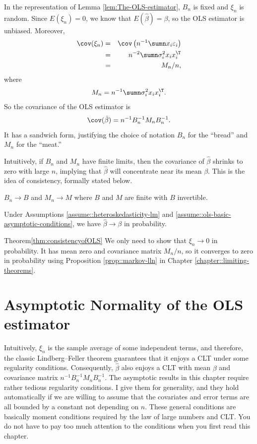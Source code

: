 In the representation of Lemma \ref{lem:The-OLS-estimator}, $B_n$ is fixed and $\xi_n$ is random. Since $E(\xi_n) = 0$, we know that $E(\hat{\beta})=\beta$, so the OLS estimator is unbiased. Moreover, 
\begin{eqnarray*}
\cov(\xi_n)  
&=&  \cov\left( n^{-1}\sumn x_{i}\varepsilon_{i} \right)   \\
&=& n^{-2} \sumn \sigma_{i}^{2}x_{i}x_{i}^{\T} \\
&=&  M_n/n,
\end{eqnarray*}
where
$$
M_{n}=n^{-1}\sumn\sigma_{i}^{2}x_{i}x_{i}^{\T}.
$$
So the covariance of the OLS estimator is 
$$
\cov(\hat{\beta})=n^{-1}B_{n}^{-1}M_{n}B_{n}^{-1}.
$$
It has a sandwich form, justifying
the choice of notation $B_n$ for the ``bread'' and $M_n$ for the ``meat.'' 


Intuitively, if $B_{n}$ and $M_{n}$ have finite limits, then the
covariance of $\hat{\beta}$ shrinks to zero with large $n$, implying
that $\hat{\beta}$ will concentrate near its mean $\beta$. This
is the idea of consistency, formally stated below. 
\begin{assumption}
\label{assume::ols-basic-asymptotic-conditions}
$B_{n}\rightarrow B$ and $M_{n}\rightarrow M$
where $B$ and $M$ are finite with $B$ invertible.
\end{assumption}

\begin{theorem}
\label{thm:consistencyofOLS} Under Assumptions \ref{assume::heteroskedasticity-lm} and \ref{assume::ols-basic-asymptotic-conditions}, we have $\hat{\beta}\rightarrow\beta$
in probability.
\end{theorem}


\begin{myproof}{Theorem}{\ref{thm:consistencyofOLS}}
We only need to show that $ \xi_n \rightarrow0$
in probability. It has mean zero and covariance matrix $M_{n}/n$,
so it converges to zero in probability using Proposition \ref{prop::markov-lln} in Chapter \ref{chapter::limiting-theorems}. 
\end{myproof}

\section{Asymptotic Normality of the OLS estimator}

Intuitively, $ \xi_n$ is the sample average
of some independent terms, and therefore, the classic Lindberg--Feller
theorem guarantees that it enjoys a CLT under some regularity conditions.
Consequently, $\hat{\beta}$ also enjoys a CLT with mean $\beta$
and covariance matrix $n^{-1}B_{n}^{-1}M_{n}B_{n}^{-1}.$ The asymptotic results in this chapter require rather tedious regularity conditions. I give them for generality, and they hold automatically if we are willing to assume that the covariates and error terms are all bounded by a constant not depending on $n$. These general conditions are basically moment conditions required by the law of large numbers and CLT.  You do not have to pay too much attention to the conditions when you first read this chapter. 




